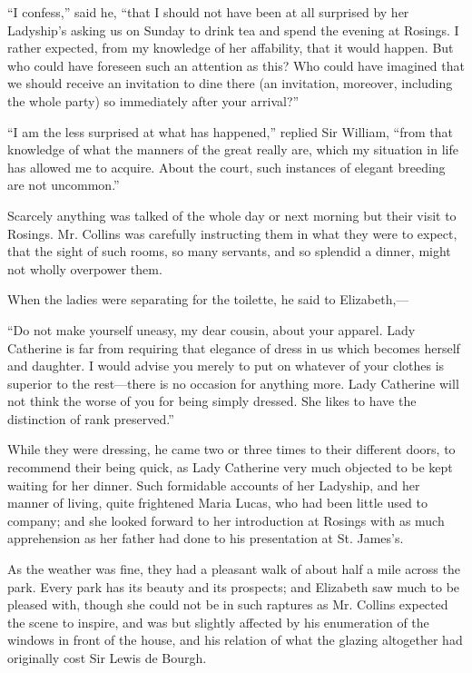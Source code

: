 \documentclass[12pt]{book}
\begin{document}
``I confess,'' said he, ``that I should not have been at all surprised by her Ladyship's asking us on Sunday to drink tea and spend the evening at Rosings. I rather expected, from my knowledge of her affability, that it would happen. But who could have foreseen such an attention as this? Who could have imagined that we should receive an invitation to dine there (an invitation, moreover, including the whole party) so immediately after your arrival?''

``I am the less surprised at what has happened,'' replied Sir William, ``from that knowledge of what the manners of the great really are, which my situation in life has allowed me to acquire. About the court, such instances of elegant breeding are not uncommon.''

Scarcely anything was talked of the whole day or next morning but their visit to Rosings. Mr. Collins was carefully instructing them in what they were to expect, that the sight of such rooms, so many servants, and so splendid a dinner, might not wholly overpower them.

When the ladies were separating for the toilette, he said to Elizabeth,---

``Do not make yourself uneasy, my dear cousin, about your apparel. Lady Catherine is far from requiring that elegance of dress in us which becomes herself and daughter. I would advise you merely to put on whatever of your clothes is superior to the rest---there is no occasion for anything more. Lady Catherine will not think the worse of you for being simply dressed. She likes to have the distinction of rank preserved.''

While they were dressing, he came two or three times to their different doors, to recommend their being quick, as Lady Catherine very much objected to be kept waiting for her dinner. Such formidable accounts of her Ladyship, and her manner of living, quite frightened Maria Lucas, who had been little used to company; and she looked forward to her introduction at Rosings with as much apprehension as her father had done to his presentation at St. James's.

As the weather was fine, they had a pleasant walk of about half a mile across the park. Every park has its beauty and its prospects; and Elizabeth saw much to be pleased with, though she could not be in such raptures as Mr. Collins expected the scene to inspire, and was but slightly affected by his enumeration of the windows in front of the house, and his relation of what the glazing altogether had originally cost Sir Lewis de Bourgh.
\end{document}
